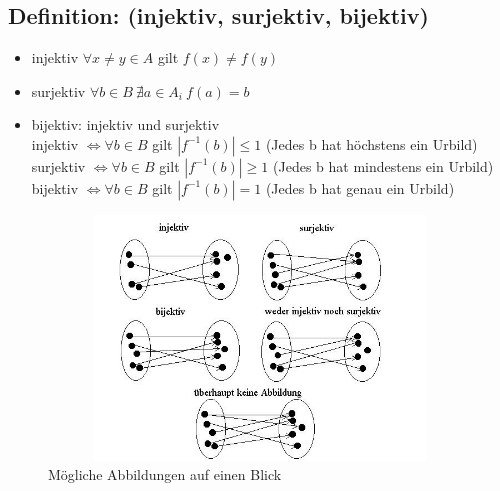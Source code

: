 \subsection{Definition: (injektiv, surjektiv, bijektiv)}
\begin{itemize}
	\item injektiv $\forall x \neq y \in A$ gilt $f(x)\neq f(y)$
	\item surjektiv $\forall b \in B ~ \nexists a \in A_{i} ~ f(a)=b$
	\item bijektiv: injektiv und surjektiv\\
		injektiv $\Leftrightarrow \forall b\in B$ gilt $|f^{-1}(b)| \leq 1$ (Jedes b hat 
		höchstens ein Urbild)\\
		surjektiv $ \Leftrightarrow \forall b \in B$ gilt $|f^{-1}(b)| \geq 1$ (Jedes b hat 
		mindestens ein Urbild)\\
		bijektiv $\Leftrightarrow \forall b \in B$ gilt $|f^{-1}(b)| = 1$ (Jedes b hat genau 
		ein Urbild)
\end{itemize}
%
\begin{figure} [H]
	\centering 
	\includegraphics[width=12cm, height=6.5cm]{mainmatter/chapter0/pics/abbildungen.jpg}
	\caption{Mögliche Abbildungen auf einen Blick} 
\end{figure}
